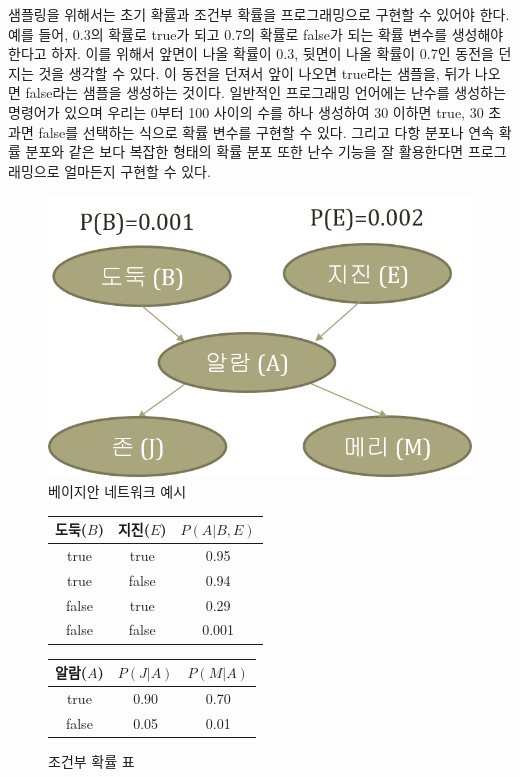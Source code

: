 \documentclass[a4paper]{oblivoir}
\begin{document}
샘플링을 위해서는 초기 확률과 조건부 확률을 프로그래밍으로 구현할 수 있어야 한다. 예를 들어, 0.3의 확률로 true가 되고 0.7의 확률로 false가 되는 확률 변수를 생성해야 한다고 하자. 이를 위해서 앞면이 나올 확률이 0.3, 뒷면이 나올 확률이 0.7인 동전을 던지는 것을 생각할 수 있다. 이 동전을 던져서 앞이 나오면 true라는 샘플을, 뒤가 나오면 false라는 샘플을 생성하는 것이다. 일반적인 프로그래밍 언어에는 난수를 생성하는 명령어가 있으며 우리는 0부터 100 사이의 수를 하나 생성하여 30 이하면 true, 30 초과면 false를 선택하는 식으로 확률 변수를 구현할 수 있다. 그리고 다항 분포나 연속 확률 분포와 같은 보다 복잡한 형태의 확률 분포 또한 난수 기능을 잘 활용한다면 프로그래밍으로 얼마든지 구현할 수 있다. \\

\begin{figure}[ht] \centering 
\includegraphics[scale=0.6]{fig10_1.png} 
\caption{베이지안 네트워크 예시}
\label{fig:10-1}
\end{figure} 

\begin{figure}[ht] \centering 
\parbox[t]{3cm}
{
\begin{tabular}{|c|c|c|}
  \hline
  도둑($B$) & 지진($E$) & $P(A|B,E)$ \\
  \hline
  true & true & 0.95 \\
  \hline
  true & false & 0.94 \\
  \hline
  false & true & 0.29 \\
  \hline
  false & false & 0.001 \\
  \hline
\end{tabular}
} \hspace{3cm}
\parbox[t]{5cm}
{
\begin{tabular}{|c|c|c|}
  \hline
  알람($A$) & $P(J|A)$ & $P(M|A)$ \\
  \hline
  true & 0.90 & 0.70 \\
  \hline
  false & 0.05 & 0.01 \\
  \hline
\end{tabular}
}
\caption{조건부 확률 표}
\label{fig:10-1-1}
\end{figure} 
\end{document}
